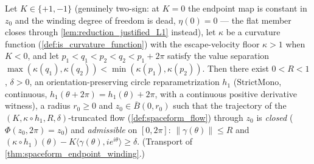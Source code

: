 \begin{theorem}
  \label{thm:spaceform_endpoint_winding}
  Let $K\in\{+1,-1\}$ (genuinely two-sign: at $K=0$ the
  endpoint map is constant in $z_0$ and the winding degree of freedom is dead,
  $\eta(0)=0$ — the flat member closes through
  \cref{lem:reduction_justified_L1} instead), let $\kappa$ be a curvature
  function (\cref{def:is_curvature_function}) with the escape-velocity floor
  $\kappa>1$ when $K<0$, and let $p_1<q_1<p_2<q_2<p_1+2\pi$ satisfy the
  value separation
  $\max(\kappa(q_1),\kappa(q_2))<\min(\kappa(p_1),\kappa(p_2))$. Then there exist
  $0<R<1$, $\delta>0$, an orientation-preserving circle reparametrization $h_1$
  ($\mathrm{StrictMono}$, continuous, $h_1(\theta+2\pi)=h_1(\theta)+2\pi$, with a
  continuous positive derivative witness), a radius $r_0\ge0$ and
  $z_0\in\overline B(0,r_0)$ such that the trajectory of the
  $(K,\kappa\circ h_1,R,\delta)$-truncated flow
  (\cref{def:spaceform_flow}) through $z_0$ is \emph{closed}
  ($\Phi(z_0,2\pi)=z_0$) and \emph{admissible} on $[0,2\pi]$:
  $\|\gamma(\theta)\|\le R$ and
  $(\kappa\circ h_1)(\theta)-K\langle \gamma(\theta),ie^{i\theta}\rangle
  \ge\delta$. (Transport of \cref{thm:spaceform_endpoint_winding}.)
\end{theorem}

